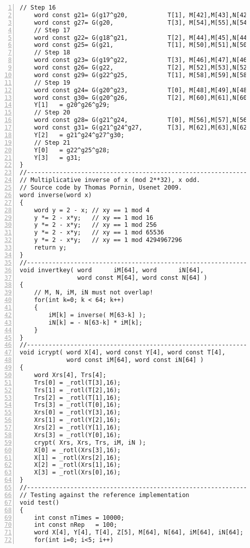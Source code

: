 \documentclass[a4paper,oneside,english]{amsart}
\numberwithin{equation}{section}
\numberwithin{figure}{section}
\begin{document}
\begin{lstlisting}[basicstyle={\scriptsize\ttfamily},numbers=left,tabsize=4]
    // Step 16
    word const g21= G(g17^g20,           T[1], M[42],M[43],N[42],N[43]);
    word const g27= G(g20,               T[3], M[54],M[55],N[54],N[55]);
    // Step 17
    word const g22= G(g18^g21,           T[2], M[44],M[45],N[44],N[45]);
    word const g25= G(g21,               T[1], M[50],M[51],N[50],N[51]);
    // Step 18
    word const g23= G(g19^g22,           T[3], M[46],M[47],N[46],N[47]);
    word const g26= G(g22,               T[2], M[52],M[53],N[52],N[53]);
    word const g29= G(g22^g25,           T[1], M[58],M[59],N[58],N[59]);
    // Step 19
    word const g24= G(g20^g23,           T[0], M[48],M[49],N[48],N[49]);
    word const g30= G(g20^g26,           T[2], M[60],M[61],N[60],N[61]);
    Y[1]   = g20^g26^g29;
    // Step 20
    word const g28= G(g21^g24,           T[0], M[56],M[57],N[56],N[57]);
    word const g31= G(g21^g24^g27,       T[3], M[62],M[63],N[62],N[63]);
    Y[2]   = g21^g24^g27^g30;
    // Step 21
    Y[0]   = g22^g25^g28;
    Y[3]   = g31;
}
//----------------------------------------------------------------------
// Multiplicative inverse of x (mod 2**32), x odd.
// Source code by Thomas Pornin, Usenet 2009.
word inverse(word x)
{
    word y = 2 - x; // xy == 1 mod 4
    y *= 2 - x*y;   // xy == 1 mod 16
    y *= 2 - x*y;   // xy == 1 mod 256
    y *= 2 - x*y;   // xy == 1 mod 65536
    y *= 2 - x*y;   // xy == 1 mod 4294967296
    return y;
}
//----------------------------------------------------------------------
void invertkey( word      iM[64], word      iN[64], 
                word const M[64], word const N[64] )
{
    // M, N, iM, iN must not overlap!
    for(int k=0; k < 64; k++)
    {
        iM[k] = inverse( M[63-k] );
        iN[k] = - N[63-k] * iM[k];
    }
}
//----------------------------------------------------------------------
void icrypt( word X[4], word const Y[4], word const T[4], 
             word const iM[64], word const iN[64] )
{   
    word Xrs[4], Trs[4];
    Trs[0] = _rotl(T[3],16);
    Trs[1] = _rotl(T[2],16);
    Trs[2] = _rotl(T[1],16);
    Trs[3] = _rotl(T[0],16);
    Xrs[0] = _rotl(Y[3],16);
    Xrs[1] = _rotl(Y[2],16);
    Xrs[2] = _rotl(Y[1],16);
    Xrs[3] = _rotl(Y[0],16);
    crypt( Xrs, Xrs, Trs, iM, iN );
    X[0] = _rotl(Xrs[3],16);
    X[1] = _rotl(Xrs[2],16);
    X[2] = _rotl(Xrs[1],16);
    X[3] = _rotl(Xrs[0],16);
}
//----------------------------------------------------------------------
// Testing against the reference implementation
void test()
{
    int const nTimes = 10000;
    int const nRep   = 100;
    word X[4], Y[4], T[4], Z[5], M[64], N[64], iM[64], iN[64];
    for(int i=0; i<5; i++)

\end{lstlisting}
\end{document}
